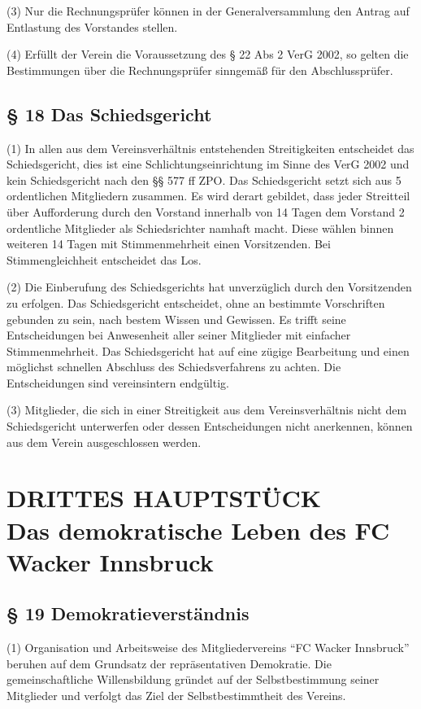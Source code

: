 \documentclass[10pt,a4paper]{article}
\begin{document}
(3)
Nur die Rechnungsprüfer können in der Generalversammlung den Antrag auf Entlastung des Vorstandes stellen.

(4)
Erfüllt der Verein die Voraussetzung des § 22 Abs 2 VerG 2002, so gelten die Bestimmungen über die Rechnungsprüfer sinngemäß für den Abschlussprüfer.

\subsection{§ 18
Das Schiedsgericht}

(1)
In allen aus dem Vereinsverhältnis entstehenden Streitigkeiten entscheidet das Schiedsgericht, dies ist eine Schlichtungseinrichtung im Sinne des VerG 2002 und kein Schiedsgericht nach den §§ 577 ff ZPO.
Das Schiedsgericht setzt sich aus 5 ordentlichen Mitgliedern zusammen.
Es wird derart gebildet, dass jeder Streitteil über Aufforderung durch den Vorstand innerhalb von 14 Tagen dem Vorstand 2 ordentliche Mitglieder als Schiedsrichter namhaft macht.
Diese wählen binnen weiteren 14 Tagen mit Stimmenmehrheit einen Vorsitzenden.
Bei Stimmengleichheit entscheidet das Los.

(2)
Die Einberufung des Schiedsgerichts hat unverzüglich durch den Vorsitzenden zu erfolgen.
Das Schiedsgericht entscheidet, ohne an bestimmte Vorschriften gebunden zu sein, nach bestem Wissen und Gewissen.
Es trifft seine Entscheidungen bei Anwesenheit aller seiner Mitglieder mit einfacher Stimmenmehrheit.
Das Schiedsgericht hat auf eine zügige Bearbeitung und einen möglichst schnellen Abschluss des Schiedsverfahrens zu achten.
Die Entscheidungen sind vereinsintern endgültig.

(3)
Mitglieder, die sich in einer Streitigkeit aus dem Vereinsverhältnis nicht dem Schiedsgericht unterwerfen oder dessen Entscheidungen nicht anerkennen, können aus dem Verein ausgeschlossen werden.

\section{DRITTES HAUPTSTÜCK\\Das demokratische Leben des FC Wacker Innsbruck}

\subsection{§ 19
Demokratieverständnis}

(1)
Organisation und Arbeitsweise des Mitgliedervereins "`FC Wacker Innsbruck"' beruhen auf dem Grundsatz der repräsentativen Demokratie.
Die gemeinschaftliche Willensbildung gründet auf der Selbstbestimmung seiner Mitglieder und verfolgt das Ziel der Selbstbestimmtheit des Vereins.
\end{document}
